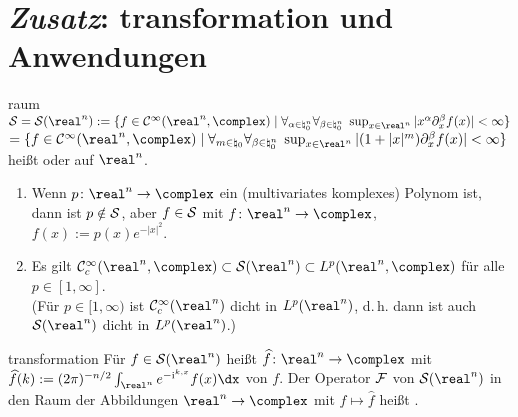 \pagebreak

\section{%
    \emph{Zusatz}: transformation und Anwendungen%
}

\begin{Def}{raum}
    $\S = \S(\real^n) :=
    \{f \in \C^\infty(\real^n, \complex) \;|\;
    \forall_{\alpha\in\natural_0^n} \forall_{\beta\in\natural_0^n}\;
    \sup_{x \in \real^n} |x^\alpha \partial_x^\beta f(x)| < \infty\}$\\
    $= \{f \in \C^\infty(\real^n, \complex) \;|\;
    \forall_{m \in \natural_0} \forall_{\beta \in \natural_0^n}\;
    \sup_{x \in \real^n} |(1 + |x|^m) \partial_x^\beta f(x)| < \infty\}$\\
    heißt  oder
     auf $\real^n$.
\end{Def}

\begin{Bem}
    \begin{enumerate}
        \item
        Wenn $p\colon \real^n \rightarrow \complex$ ein
        (multivariates komplexes) Polynom ist, dann ist $p \notin \S$,
        aber $f \in \S$ mit $f\colon \real^n \rightarrow \complex$, $f(x) := p(x) e^{-|x|^2}$.

        \item
        Es gilt $\C^\infty_c(\real^n, \complex) \subset \S(\real^n) \subset L^p(\real^n, \complex)$
        für alle $p \in [1, \infty]$.\\
        (Für $p \in [1, \infty)$ ist $\C^\infty_c(\real^n)$ dicht in $L^p(\real^n)$,
        d.\,h. dann ist auch $\S(\real^n)$ dicht in $L^p(\real^n)$.)
    \end{enumerate}
\end{Bem}

\linie

\begin{Def}{transformation}
    Für $f \in \S(\real^n)$ heißt $\widehat{f}\colon \real^n \rightarrow \complex$ mit\\
    $\widehat{f}(k) := (2\pi)^{-n/2} \int_{\real^n} e^{-\iu\sp{k,x}} f(x)\dx$
     von $f$.
    Der Operator $\F$ von $\S(\real^n)$ in den Raum der Abbildungen $\real^n \rightarrow \complex$
    mit $f \mapsto \widehat{f}$ heißt .
\end{Def}

